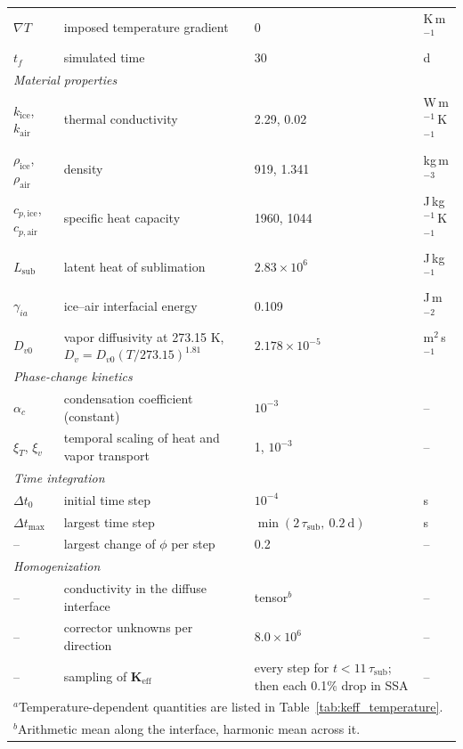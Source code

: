 \begin{table}
\begin{tabular}{l l l l}
 $\nabla T$ & imposed temperature gradient & 0 & K\,m$^{-1}$ \\
 $t_f$ & simulated time & 30 & d \\
 \multicolumn{4}{l}{\textit{Material properties}} \\
 $k_{\mathrm{ice}}$, $k_{\mathrm{air}}$ & thermal conductivity & 2.29, 0.02 & W\,m$^{-1}$\,K$^{-1}$ \\
 $\rho_{\mathrm{ice}}$, $\rho_{\mathrm{air}}$ & density & 919, 1.341 & kg\,m$^{-3}$ \\
 $c_{p,\mathrm{ice}}$, $c_{p,\mathrm{air}}$ & specific heat capacity & 1960, 1044 & J\,kg$^{-1}$\,K$^{-1}$ \\
 $L_{\mathrm{sub}}$ & latent heat of sublimation & $2.83 \times 10^{6}$ & J\,kg$^{-1}$ \\
 $\gamma_{ia}$ & ice--air interfacial energy & 0.109 & J\,m$^{-2}$ \\
 $D_{v0}$ & vapor diffusivity at 273.15 K, $D_v = D_{v0}(T/273.15)^{1.81}$ & $2.178 \times 10^{-5}$ & m$^{2}$\,s$^{-1}$ \\
 \multicolumn{4}{l}{\textit{Phase-change kinetics}} \\
 $\alpha_c$ & condensation coefficient (constant) & $10^{-3}$ & -- \\
 $\xi_T$, $\xi_v$ & temporal scaling of heat and vapor transport & 1, $10^{-3}$ & -- \\
 \multicolumn{4}{l}{\textit{Time integration}} \\
 $\Delta t_0$ & initial time step & $10^{-4}$ & s \\
 $\Delta t_{\max}$ & largest time step & $\min(2\,\tau_{\mathrm{sub}},\ 0.2\ \mathrm{d})$ & s \\
 -- & largest change of $\phi$ per step & 0.2 & -- \\
 \multicolumn{4}{l}{\textit{Homogenization}} \\
 -- & conductivity in the diffuse interface & tensor$^{b}$ & -- \\
 -- & corrector unknowns per direction & $8.0 \times 10^{6}$ & -- \\
 -- & sampling of $\mathbf{K}_{\mathrm{eff}}$ & every step for $t < 11\,\tau_{\mathrm{sub}}$; then each 0.1\% drop in SSA & -- \\
\hline
\multicolumn{4}{l}{$^{a}$Temperature-dependent quantities are listed in Table~\ref{tab:keff_temperature}.} \\
\multicolumn{4}{l}{$^{b}$Arithmetic mean along the interface, harmonic mean across it.}
\end{tabular}
\label{tab:keff_parameters}
\end{table}

